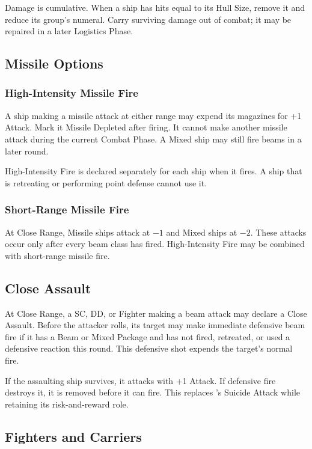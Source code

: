 Damage is cumulative. When a ship has hits equal to its Hull Size, remove it
and reduce its group's numeral. Carry surviving damage out of combat; it may be
repaired in a later Logistics Phase.

\subsection{Missile Options}

\subsubsection{High-Intensity Missile Fire}

A ship making a missile attack at either range may expend its magazines for
+1 Attack. Mark it Missile Depleted after firing. It cannot make another
missile attack during the current Combat Phase. A Mixed ship may still fire
beams in a later round.

High-Intensity Fire is declared separately for each ship when it fires. A ship
that is retreating or performing point defense cannot use it.

\subsubsection{Short-Range Missile Fire}

At Close Range, Missile ships attack at $-1$ and Mixed ships at $-2$. These
attacks occur only after every beam class has fired. High-Intensity Fire may be
combined with short-range missile fire.

\subsection{Close Assault}

At Close Range, a SC, DD, or Fighter making a beam attack may declare a Close
Assault. Before the attacker rolls, its target may make immediate defensive
beam fire if it has a Beam or Mixed Package and has not fired, retreated, or
used a defensive reaction this round. This defensive shot expends the target's
normal fire.

If the assaulting ship survives, it attacks with +1 Attack. If defensive fire
destroys it, it is removed before it can fire. This replaces \Imperium's
Suicide Attack while retaining its risk-and-reward role.

\subsection{Fighters and Carriers}

